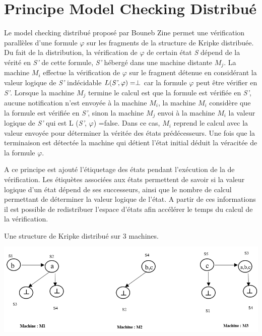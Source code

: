 
\section{Principe Model Checking Distribu\'{e}}
 
Le model checking distribu\'{e} propos\'{e} par Bouneb Zine permet une v\'{e}rification parall\`{e}les d’une formule $\varphi$  sur les fragments de la structure de Kripke distribu\'{e}e. Du fait de la distribution, la v\'{e}rification de $\varphi$ de certain \'{e}tat \emph{S} d\'{e}pend de la v\'{e}rit\'{e} en \emph{S’} de cette formule, \emph{S’}  h\'{e}berg\'{e} dans une  machine distante $M_j$. La machine $M_i$ effectue la v\'{e}rification de $\varphi$ sur le fragment d\'{e}tenue en consid\'{e}rant la valeur logique de \emph{S’} ind\'{e}cidable  $L (\emph{S’},\varphi )=\perp$ car la formule $\varphi$ peut \^{e}tre v\'{e}rifier en \emph{S’}. Lorsque la machine $M_j$ termine le calcul est que la formule est v\'{e}rifi\'{e}e en \emph{S’}, aucune notification n'est envoy\'{e}e \`{a} la machine $M_i$, la machine $M_i$ consid\`{e}re que la formule est v\'{e}rifi\'{e}e en \emph{S’}, sinon la machine $M_j$ envoi \`{a} la machine $M_i$ la valeur logique de \emph{S’} qui est L (\emph{S’}, $\varphi$) =false. Dans ce cas, $M_i$ reprend le calcul avec la valeur envoyée pour d\'{e}terminer la v\'{e}rit\'{e}e des \'{e}tats prédécesseurs. Une fois que la terminaison est d\'{e}tect\'{e}e  la machine qui détient l’\'{e}tat initial d\'{e}duit la v\'{e}racit\'{e}e de la formule $\varphi$.

A ce principe est ajouté l'étiquetage des \'{e}tats pendant l'exécution de la de v\'{e}rification. Les \'{e}tiqu\`{e}tes associées aux \'{e}tats permettent de savoir si la valeur logique d'un état dépend de ses successeurs, ainsi que le nombre de calcul permettant de déterminer la valeur logique de l'état. A partir de ces informations il est possible  de redistribuer l'espace d’\'{e}tats afin acc\'{e}l\'{e}rer le temps du calcul de la vérification.

\begin{Exemple}
   Une structure de Kripke distribu\'{e} sur 3 machines.
   \centering
	\includegraphics[height=2in]{img/skd1.png}
	

\end{Exemple}


